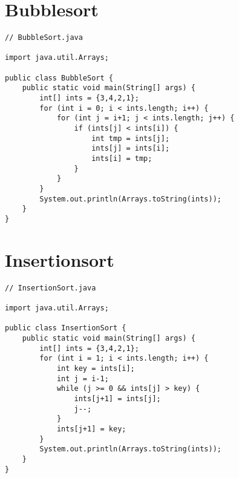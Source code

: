 \section{Bubblesort}
\begin{center}
\end{center}
\pagebreak
\begin{center}  
\begin{lstlisting}
// BubbleSort.java

import java.util.Arrays;

public class BubbleSort {
    public static void main(String[] args) {
        int[] ints = {3,4,2,1};
        for (int i = 0; i < ints.length; i++) {
            for (int j = i+1; j < ints.length; j++) {
                if (ints[j] < ints[i]) {
                    int tmp = ints[j];
                    ints[j] = ints[i];
                    ints[i] = tmp;
                }
            }
        }
        System.out.println(Arrays.toString(ints));
    }
}
\end{lstlisting}
\end{center}

\section{Insertionsort}
\begin{center}
\begin{lstlisting}
// InsertionSort.java

import java.util.Arrays;

public class InsertionSort {
    public static void main(String[] args) {
        int[] ints = {3,4,2,1};
        for (int i = 1; i < ints.length; i++) {
            int key = ints[i];
            int j = i-1;
            while (j >= 0 && ints[j] > key) {
                ints[j+1] = ints[j];
                j--;
            }
            ints[j+1] = key;
        }
        System.out.println(Arrays.toString(ints));
    }
}
\end{lstlisting}
\end{center}
